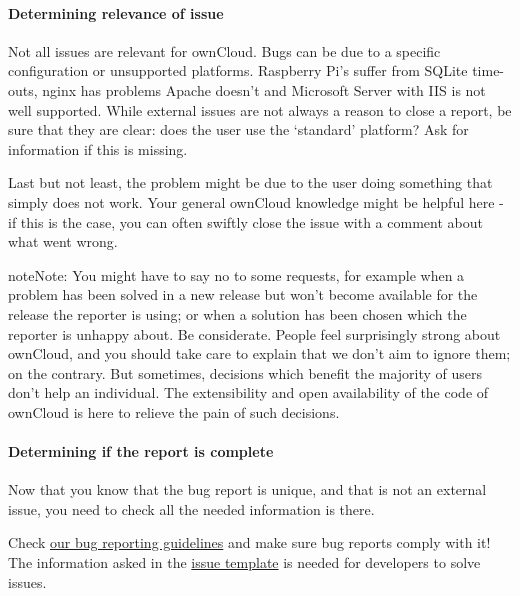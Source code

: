 \documentclass[letterpaper,10pt,english]{sphinxmanual}
\begin{document}
\paragraph{Determining relevance of issue}
\label{bugtracker/triaging:determining-relevance-of-issue}
Not all issues are relevant for ownCloud. Bugs can be due to a specific configuration or unsupported platforms. Raspberry Pi's suffer from SQLite time-outs, nginx has problems Apache doesn't and Microsoft Server with IIS is not well supported. While external issues are not always a reason to close a report, be sure that they are clear: does the user use the `standard' platform? Ask for information if this is missing.

Last but not least, the problem might be due to the user doing something that simply does not work. Your general ownCloud knowledge might be helpful here - if this is the case, you can often swiftly close the issue with a comment about what went wrong.

\begin{notice}{note}{Note:}
You might have to say no to some requests, for example when a problem has been solved in a new release but won't become available for the release the reporter is using; or when a solution has been chosen which the reporter is unhappy about. Be considerate. People feel surprisingly strong about ownCloud, and you should take care to explain that we don't aim to ignore them; on the contrary. But sometimes, decisions which benefit the majority of users don't help an individual. The extensibility and open availability of the code of ownCloud is here to relieve the pain of such decisions.
\end{notice}


\paragraph{Determining if the report is complete}
\label{bugtracker/triaging:determining-if-the-report-is-complete}
Now that you know that the bug report is unique, and that is not an external issue, you need to check all the needed information is there.

Check \href{https://github.com/owncloud/core/blob/master/.github/CONTRIBUTING.md\#submitting-issues}{our bug reporting guidelines} and make sure bug reports comply with it! The information asked in the \href{https://raw.github.com/owncloud/core/master/.github/issue\_template.md}{issue template} is needed for developers to solve issues.
\end{document}
